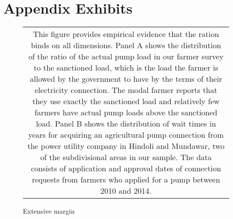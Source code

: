 \documentclass{article}
\numberwithin{table}{section}
\begin{document}
\renewcommand{\tabcolsep}{8pt}


\renewcommand{\tabcolsep}{8pt}
% 


\renewcommand{\tabcolsep}{8pt}


\renewcommand{\tabcolsep}{9pt}


\clearpage
\section{Appendix Exhibits}	

\begin{figure}[htbp]
	\centering
	\caption{Extensive margin\label{fig:sanctionedLoadBinds}}
	\subfiguretopcaptrue
	\begin{tabular*}{1.0\textwidth}{c}
		\multicolumn{1}{p{1.0\hsize}}{\footnotesize This figure provides empirical evidence that the ration binds on all dimensions. Panel A shows the distribution of the ratio of the actual pump load in our farmer survey to the sanctioned load, which is the load the farmer is allowed by the government to have by the terms of their electricity connection. The modal farmer reports that they use exactly the sanctioned load and relatively few farmers have actual pump loads above the sanctioned load. Panel B shows the distribution of wait times in years for acquiring an agricultural pump connection from the power utility company in Hindoli and Mundawar, two of the subdivisional areas in our sample. The data consists of application and approval dates of connection requests from farmers who applied for a pump between 2010 and 2014.}\\
	\end{tabular*}
\end{figure}

\clearpage

\renewcommand{\tabcolsep}{12pt}

\end{document}

